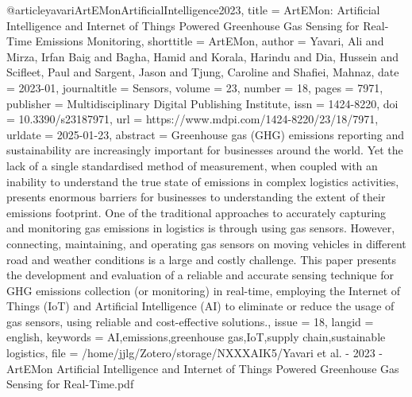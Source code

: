 {{{{@article{yavariArtEMonArtificialIntelligence2023,
  title = {{{ArtEMon}}: {{Artificial Intelligence}} and {{Internet}} of {{Things Powered Greenhouse Gas Sensing}} for {{Real-Time Emissions Monitoring}}},
  shorttitle = {{{ArtEMon}}},
  author = {Yavari, Ali and Mirza, Irfan Baig and Bagha, Hamid and Korala, Harindu and Dia, Hussein and Scifleet, Paul and Sargent, Jason and Tjung, Caroline and Shafiei, Mahnaz},
  date = {2023-01},
  journaltitle = {Sensors},
  volume = {23},
  number = {18},
  pages = {7971},
  publisher = {Multidisciplinary Digital Publishing Institute},
  issn = {1424-8220},
  doi = {10.3390/s23187971},
  url = {https://www.mdpi.com/1424-8220/23/18/7971},
  urldate = {2025-01-23},
  abstract = {Greenhouse gas (GHG) emissions reporting and sustainability are increasingly important for businesses around the world. Yet the lack of a single standardised method of measurement, when coupled with an inability to understand the true state of emissions in complex logistics activities, presents enormous barriers for businesses to understanding the extent of their emissions footprint. One of the traditional approaches to accurately capturing and monitoring gas emissions in logistics is through using gas sensors. However, connecting, maintaining, and operating gas sensors on moving vehicles in different road and weather conditions is a large and costly challenge. This paper presents the development and evaluation of a reliable and accurate sensing technique for GHG emissions collection (or monitoring) in real-time, employing the Internet of Things (IoT) and Artificial Intelligence (AI) to eliminate or reduce the usage of gas sensors, using reliable and cost-effective solutions.},
  issue = {18},
  langid = {english},
  keywords = {AI,emissions,greenhouse gas,IoT,supply chain,sustainable logistics},
  file = {/home/jjlg/Zotero/storage/NXXXAIK5/Yavari et al. - 2023 - ArtEMon Artificial Intelligence and Internet of Things Powered Greenhouse Gas Sensing for Real-Time.pdf}
}

}}}}
